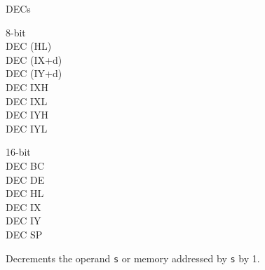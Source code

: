 \begin{basedescript}{
	\desclabelstyle{\multilinelabel}
	\desclabelwidth{3cm}}
\begin{DetailItem}{DEC}{s}
\begin{DetailVariants}
			\columnbreak
			\textnormal{8-bit}\\
			DEC (HL)\\
			DEC (IX+d)\\
			DEC (IY+d)\\
			DEC IXH\UNDOC\\
			DEC IXL\UNDOC\\
			DEC IYH\UNDOC\\
			DEC IYL\UNDOC

			\columnbreak
			\textnormal{16-bit}\\
			DEC BC\\
			DEC DE\\
			DEC HL\\
			DEC IX\\
			DEC IY\\
			DEC SP
		\end{DetailVariants}

		Decrements the operand {\tt s} or memory addressed by {\tt s} by 1.

		\begin{DetailEffects}[v]
			\FlagsDECr[8-bit]
		\end{DetailEffects}

		\begin{DetailEffectsFlags}
		\end{DetailEffectsFlags}

		\begin{DetailTiming}
		\end{DetailTiming}

	\end{DetailItem}

	\pagebreak



\end{basedescript}
